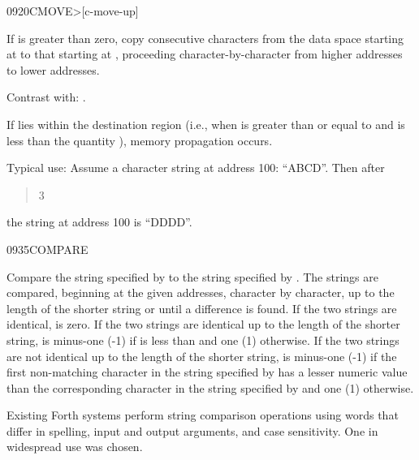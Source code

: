 \begin{worddef}[CMOVEtop]{0920}{CMOVE>}[c-move-up]
\item {}

	If  is greater than zero, copy  consecutive
	characters from the data space starting at  to
	that starting at , proceeding character-by-character
	from higher addresses to lower addresses.

\item[Contrast with:]
	.

	\begin{rationale} %
		If  lies within the destination region (i.e.,
		when  is greater than or equal to
		 and  is less than the
		quantity  
		\word[core]{+}), memory propagation	occurs.

		Typical use: Assume a character string at address
		100: ``ABCD''. Then after
		\begin{quote}   
			3 
		\end{quote}
		the string at address 100 is ``DDDD''.
	\end{rationale}
\end{worddef}


\begin{worddef}{0935}{COMPARE}
\item {}

	Compare the string specified by  to the
	string specified by . The strings are
	compared, beginning at the given addresses, character by
	character, up to the length of the shorter string or until a
	difference is found. If the two strings are identical, 
	is zero. If the two strings are identical up to the length of
	the shorter string,  is minus-one (-1) if 
	is less than  and one (1) otherwise. If the two
	strings are not identical up to the length of the shorter string,
	 is minus-one (-1) if the first non-matching character
	in the string specified by  has a lesser
	numeric value than the corresponding character in the string
	specified by  and one (1) otherwise.

	\begin{rationale} %
		Existing Forth systems perform string comparison operations
		using words that differ in spelling, input and output
		arguments, and case sensitivity. One in widespread use
		was chosen.
	\end{rationale}
\end{worddef}


